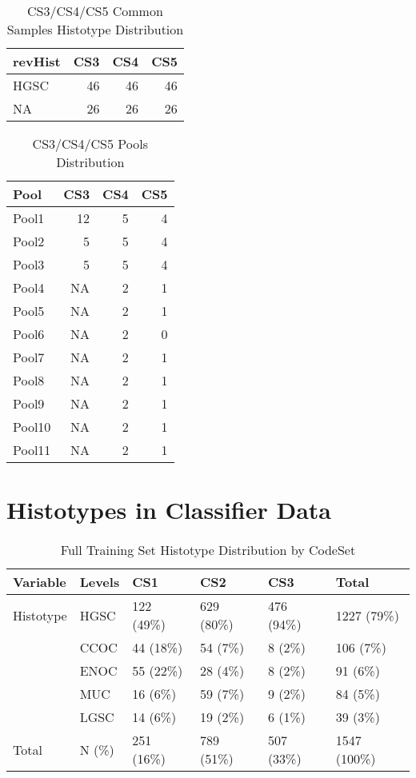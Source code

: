 \documentclass[
]{report}
\begin{document}
\begin{table}

\caption{\label{tab:cs345-overlap}CS3/CS4/CS5 Common Samples Histotype Distribution}
\centering
\begin{tabular}[t]{l|r|r|r}
\hline
revHist & CS3 & CS4 & CS5\\
\hline
HGSC & 46 & 46 & 46\\
\hline
NA & 26 & 26 & 26\\
\hline
\end{tabular}
\end{table}

\begin{table}

\caption{\label{tab:cs345-pools}CS3/CS4/CS5 Pools Distribution}
\centering
\begin{tabular}[t]{l|r|r|r}
\hline
Pool & CS3 & CS4 & CS5\\
\hline
Pool1 & 12 & 5 & 4\\
\hline
Pool2 & 5 & 5 & 4\\
\hline
Pool3 & 5 & 5 & 4\\
\hline
Pool4 & NA & 2 & 1\\
\hline
Pool5 & NA & 2 & 1\\
\hline
Pool6 & NA & 2 & 0\\
\hline
Pool7 & NA & 2 & 1\\
\hline
Pool8 & NA & 2 & 1\\
\hline
Pool9 & NA & 2 & 1\\
\hline
Pool10 & NA & 2 & 1\\
\hline
Pool11 & NA & 2 & 1\\
\hline
\end{tabular}
\end{table}

\hypertarget{histotypes-in-classifier-data}{%
\section{Histotypes in Classifier Data}\label{histotypes-in-classifier-data}}

\begin{table}

\caption{\label{tab:train-hist-codeset}Full Training Set Histotype Distribution by CodeSet}
\centering
\begin{tabular}[t]{l|l|l|l|l|l}
\hline
Variable & Levels & CS1 & CS2 & CS3 & Total\\
\hline
Histotype & HGSC & 122 (49\%) & 629 (80\%) & 476 (94\%) & 1227 (79\%)\\
\hline
 & CCOC & 44 (18\%) & 54 (7\%) & 8 (2\%) & 106 (7\%)\\
\hline
 & ENOC & 55 (22\%) & 28 (4\%) & 8 (2\%) & 91 (6\%)\\
\hline
 & MUC & 16 (6\%) & 59 (7\%) & 9 (2\%) & 84 (5\%)\\
\hline
 & LGSC & 14 (6\%) & 19 (2\%) & 6 (1\%) & 39 (3\%)\\
\hline
Total & N (\%) & 251 (16\%) & 789 (51\%) & 507 (33\%) & 1547 (100\%)\\
\hline
\end{tabular}
\end{table}
\end{document}
